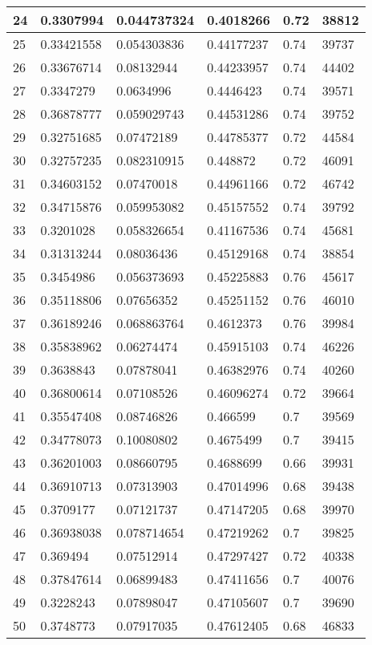 \begin{longtable}{|l|l|l|l|l|l|}
24 & 0.3307994 & 0.044737324 & 0.4018266 & 0.72 & 38812 \\ \hline 
25 & 0.33421558 & 0.054303836 & 0.44177237 & 0.74 & 39737 \\ \hline 
26 & 0.33676714 & 0.08132944 & 0.44233957 & 0.74 & 44402 \\ \hline 
27 & 0.3347279 & 0.0634996 & 0.4446423 & 0.74 & 39571 \\ \hline 
28 & 0.36878777 & 0.059029743 & 0.44531286 & 0.74 & 39752 \\ \hline 
29 & 0.32751685 & 0.07472189 & 0.44785377 & 0.72 & 44584 \\ \hline 
30 & 0.32757235 & 0.082310915 & 0.448872 & 0.72 & 46091 \\ \hline 
31 & 0.34603152 & 0.07470018 & 0.44961166 & 0.72 & 46742 \\ \hline 
32 & 0.34715876 & 0.059953082 & 0.45157552 & 0.74 & 39792 \\ \hline 
33 & 0.3201028 & 0.058326654 & 0.41167536 & 0.74 & 45681 \\ \hline 
34 & 0.31313244 & 0.08036436 & 0.45129168 & 0.74 & 38854 \\ \hline 
35 & 0.3454986 & 0.056373693 & 0.45225883 & 0.76 & 45617 \\ \hline 
36 & 0.35118806 & 0.07656352 & 0.45251152 & 0.76 & 46010 \\ \hline 
37 & 0.36189246 & 0.068863764 & 0.4612373 & 0.76 & 39984 \\ \hline 
38 & 0.35838962 & 0.06274474 & 0.45915103 & 0.74 & 46226 \\ \hline 
39 & 0.3638843 & 0.07878041 & 0.46382976 & 0.74 & 40260 \\ \hline 
40 & 0.36800614 & 0.07108526 & 0.46096274 & 0.72 & 39664 \\ \hline 
41 & 0.35547408 & 0.08746826 & 0.466599 & 0.7 & 39569 \\ \hline 
42 & 0.34778073 & 0.10080802 & 0.4675499 & 0.7 & 39415 \\ \hline 
43 & 0.36201003 & 0.08660795 & 0.4688699 & 0.66 & 39931 \\ \hline 
44 & 0.36910713 & 0.07313903 & 0.47014996 & 0.68 & 39438 \\ \hline 
45 & 0.3709177 & 0.07121737 & 0.47147205 & 0.68 & 39970 \\ \hline 
46 & 0.36938038 & 0.078714654 & 0.47219262 & 0.7 & 39825 \\ \hline 
47 & 0.369494 & 0.07512914 & 0.47297427 & 0.72 & 40338 \\ \hline 
48 & 0.37847614 & 0.06899483 & 0.47411656 & 0.7 & 40076 \\ \hline 
49 & 0.3228243 & 0.07898047 & 0.47105607 & 0.7 & 39690 \\ \hline 
50 & 0.3748773 & 0.07917035 & 0.47612405 & 0.68 & 46833 \\ \hline 
\end{longtable}